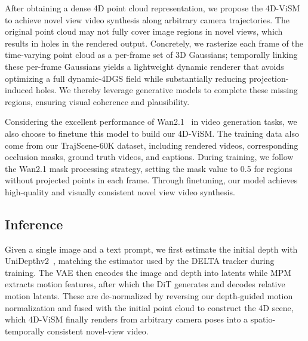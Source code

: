 After obtaining a dense 4D point cloud representation, we propose the 4D-ViSM to achieve novel view video synthesis along arbitrary camera trajectories. The original point cloud may not fully cover image regions in novel views, which results in holes in the rendered output.
Concretely, we rasterize each frame of the time-varying point cloud as a per-frame set of 3D Gaussians; temporally linking these per-frame Gaussians yields a lightweight dynamic renderer that avoids optimizing a full dynamic-4DGS field while substantially reducing projection-induced holes.
We thereby leverage generative models to complete these missing regions, ensuring visual coherence and plausibility.

Considering the excellent performance of Wan2.1~\cite{wan2025wan} in video generation tasks, we also choose to finetune this model to build our 4D-ViSM. The training data also come from our  TrajScene-60K dataset, including rendered videos, corresponding occlusion masks, ground truth videos, and captions. During training, we follow the Wan2.1 mask processing strategy, setting the mask value to 0.5 for regions without projected points in each frame. Through finetuning, our model achieves high-quality and visually consistent novel view video synthesis. 

\subsection{Inference}
\label{sec:inference}
Given a single image and a text prompt, we first estimate the initial depth with UniDepthv2~\cite{unidepthv2}, matching the estimator used by the DELTA tracker during training. The VAE then encodes the image and depth into latents while MPM extracts motion features, after which the DiT generates and decodes relative motion latents. These are de-normalized by reversing our depth-guided motion normalization and fused with the initial point cloud to construct the 4D scene, which 4D-ViSM finally renders from arbitrary camera poses into a spatio-temporally consistent novel-view video.